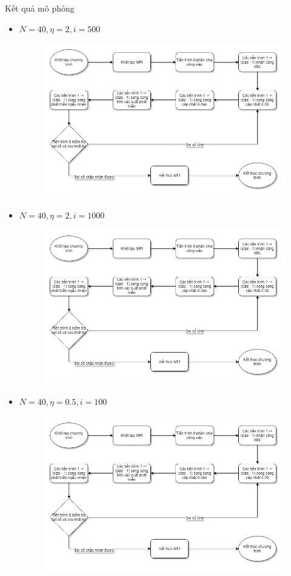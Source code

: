 \begin{frame}[allowframebreaks]{Kết quả mô phỏng}
\begin{itemize}
\begin{figure}[H]
    \end{figure}
\end{itemize}
\break
\begin{itemize}
    \item $N = 40, \eta = 2, i = 500$
    \begin{figure}[H]
        \centering
        \includegraphics[width=110mm]{img/algo-flowchart.png}
    \end{figure}
\end{itemize}
\break
\begin{itemize}
    \item $N = 40, \eta = 2, i = 1000$
    \begin{figure}[H]
        \centering
        \includegraphics[width=110mm]{img/algo-flowchart.png}
    \end{figure}
\end{itemize}
\break
\begin{itemize}
    \item $N = 40, \eta = 0.5, i = 100$
    \begin{figure}[H]
        \centering
        \includegraphics[width=110mm]{img/algo-flowchart.png}

\end{figure}
\end{itemize}
\end{frame}

